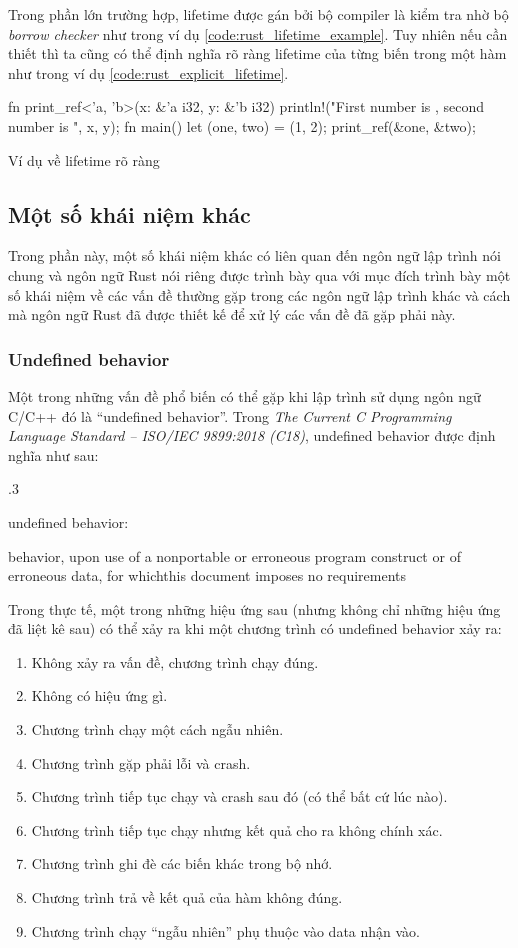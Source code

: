 Trong phần lớn trường hợp, lifetime được gán bởi bộ compiler là kiểm tra nhờ bộ \emph{borrow checker} như trong ví dụ \ref{code:rust_lifetime_example}.
Tuy nhiên nếu cần thiết thì ta cũng có thể định nghĩa rõ ràng lifetime của từng biến trong một hàm như trong ví dụ \ref{code:rust_explicit_lifetime}.
\begin{listing}[H]
\begin{rustcode}
fn print_ref<'a, 'b>(x: &'a i32, y: &'b i32) {
    println!("First number is {}, second number is {}", x, y);
}
fn main() {
  let (one, two) = (1, 2);
  print_ref(&one, &two);
}
\end{rustcode}
\caption{Ví dụ về lifetime rõ ràng}
\label{code:rust_explicit_lifetime}
\end{listing}

\subsection{Một số khái niệm khác}
Trong phần này, một số khái niệm khác có liên quan đến ngôn ngữ lập trình nói chung và ngôn ngữ Rust nói riêng được trình bày qua với mục đích trình bày một số khái niệm về các vấn đề thường gặp trong các ngôn ngữ lập trình khác và cách mà ngôn ngữ Rust đã được thiết kế để xử lý các vấn đề đã gặp phải này.
\subsubsection{Undefined behavior}
Một trong những vấn đề phổ biến có thể gặp khi lập trình sử dụng ngôn ngữ C/C++ đó là ``undefined behavior''. Trong \emph{The Current C Programming Language Standard – ISO/IEC 9899:2018 (C18)}, undefined behavior được định nghĩa như sau:

.3\par
 undefined behavior:\par
 behavior, upon use of a nonportable or erroneous program construct or of erroneous data, for whichthis document imposes no requirements
\bigskip

Trong thực tế, một trong những hiệu ứng sau (nhưng không chỉ những hiệu ứng đã liệt kê sau) có thể xảy ra khi một chương trình có undefined behavior xảy ra:

\begin{enumerate}
    \item Không xảy ra vấn đề, chương trình chạy đúng.
    \item Không có hiệu ứng gì.
    \item Chương trình chạy một cách ngẫu nhiên.
    \item Chương trình gặp phải lỗi và crash.
    \item Chương trình tiếp tục chạy và crash sau đó (có thể bất cứ lúc nào).
    \item Chương trình tiếp tục chạy nhưng kết quả cho ra không chính xác.
    \item Chương trình ghi đè các biến khác trong bộ nhớ.
    \item Chương trình trả về kết quả của hàm không đúng.
    \item Chương trình chạy ``ngẫu nhiên'' phụ thuộc vào data nhận vào.
\end{enumerate}

